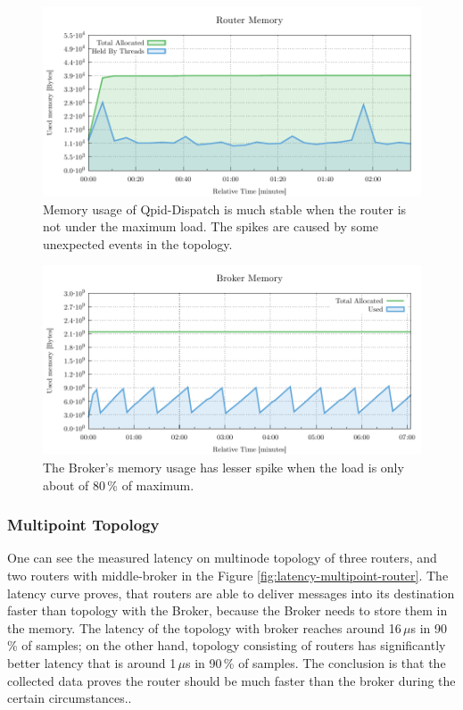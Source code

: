 \begin{figure}[H]
	\centering
	\includegraphics[width=1\linewidth]{obrazky-figures/charts/singlepoint-router-latency-memory.pdf}
	\caption{Memory usage of Qpid-Dispatch is much stable when the router is not under the maximum load. The spikes are caused by some unexpected events in the topology.}
	\label{fig:latency-single-router-memory}
\end{figure}

\begin{figure}[H]
	\centering
	\includegraphics[width=1\linewidth]{obrazky-figures/charts/singlepoint-broker-latency-memory.pdf}
	\caption{The Broker's memory usage has lesser spike when the load is only about of 80\,\% of maximum.}
	\label{fig:latency-single-broker-memory}
\end{figure}

\subsubsection*{Multipoint Topology}
One can see the measured latency on multinode topology of three routers, and two routers with middle-broker in the Figure \ref{fig:latency-multipoint-router}. The latency curve proves, that routers are able to deliver messages into its destination faster than topology with the Broker, because the Broker needs to store them in the memory. The latency of the topology with broker reaches around 16\,$\mu$s in 90\,\% of samples; on the other hand, topology consisting of routers has significantly better latency that is around 1\,$\mu$s in 90\,\% of samples. The conclusion is that the collected data proves the router should be much faster than the broker during the certain circumstances..

